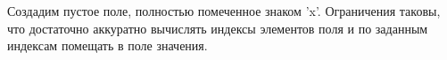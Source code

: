 \solutionSection

Создадим пустое поле, полностью помеченное знаком 'x'. Ограничения таковы, что достаточно аккуратно вычислять индексы элементов поля и по заданным индексам помещать в поле значения. 

\codeExample


